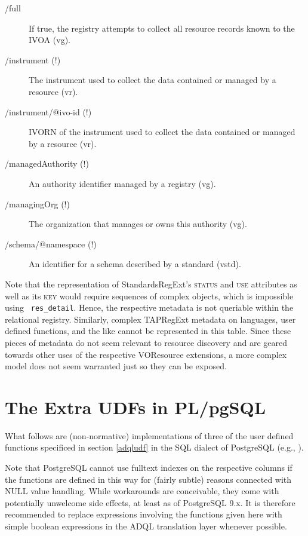 \documentclass[11pt,a4paper]{ivoa}
\newcommand{\rtent}[1]{\texttt{\color{rtcolor} #1}}
\newcommand{\vorent}[1]{\textsc{#1}}
\begin{document}
\begin{description}
\item[/full]If true, the registry attempts to collect all resource records known to the IVOA (vg).
\item[/instrument (!)]The instrument used to collect the data contained or managed by a resource (vr).
\item[/instrument/@ivo-id (!)]IVORN of the instrument used to collect the data contained or managed by a resource (vr).
\item[/managedAuthority (!)]An authority identifier managed by a registry (vg).
\item[/managingOrg (!)]The organization that manages or owns this authority (vg).
\item[/schema/@namespace (!)]An identifier for a schema described by a standard (vstd).

\end{description}

Note that the representation of StandardsRegExt's 
\vorent{status}  and \vorent{use}
attributes as well as its \vorent{key} would require sequences of
complex objects, which is impossible using \rtent{res\_detail}.
Hence, the respective metadata is not queriable
within the relational registry. Similarly, complex TAPRegExt metadata on
languages, user defined functions, and the like cannot be
represented in this table.  Since these pieces of metadata do not seem
relevant to resource discovery and are geared towards other uses of the
respective VOResource extensions, a more complex model does not seem
warranted just so they can be exposed.




\section{The Extra UDFs in
PL/pgSQL}

\label{appPGDefs}

What follows are (non-normative) 
implementations of three of the user defined functions
specificed in section \ref{adqludf} in the SQL dialect
of PostgreSQL (e.g., \citep{doc:Postgres92}).

Note that PostgreSQL cannot use fulltext indexes on the respective
columns if the functions are defined in this way for (fairly subtle)
reasons connected with NULL value handling.  While workarounds are
conceivable, they come with potentially unwelcome side effects, at least
as of PostgreSQL 9.x.  It is therefore recommended to replace
expressions involving the functions given here with simple boolean
expressions in the ADQL translation layer whenever possible.
\end{document}
